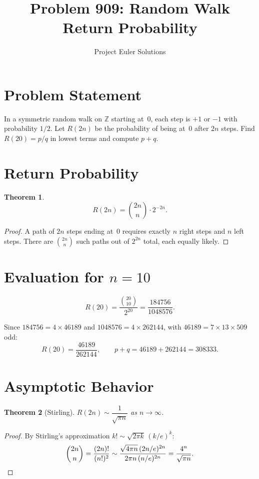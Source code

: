 \documentclass[11pt]{article}
\title{Problem 909: Random Walk Return Probability}
\author{Project Euler Solutions}
\date{}
\newtheorem{theorem}{Theorem}
\begin{document}
\maketitle

\section{Problem Statement}

In a symmetric random walk on $\mathbb{Z}$ starting at~0, each step is $+1$ or $-1$ with probability $1/2$. Let $R(2n)$ be the probability of being at~0 after $2n$ steps. Find $R(20) = p/q$ in lowest terms and compute $p + q$.

\section{Return Probability}

\begin{theorem}
\[
R(2n) = \binom{2n}{n} \cdot 2^{-2n}.
\]
\end{theorem}

\begin{proof}
A path of $2n$ steps ending at~0 requires exactly $n$ right steps and $n$ left steps. There are $\binom{2n}{n}$ such paths out of $2^{2n}$ total, each equally likely.
\end{proof}

\section{Evaluation for $n = 10$}

\[
R(20) = \frac{\binom{20}{10}}{2^{20}} = \frac{184756}{1048576}.
\]

Since $184756 = 4 \times 46189$ and $1048576 = 4 \times 262144$, with $46189 = 7 \times 13 \times 509$ odd:
\[
R(20) = \frac{46189}{262144}, \qquad p + q = 46189 + 262144 = 308333.
\]

\section{Asymptotic Behavior}

\begin{theorem}[Stirling]
$R(2n) \sim \dfrac{1}{\sqrt{\pi n}}$ as $n \to \infty$.
\end{theorem}

\begin{proof}
By Stirling's approximation $k! \sim \sqrt{2\pi k}\,(k/e)^k$:
\[
\binom{2n}{n} = \frac{(2n)!}{(n!)^2} \sim \frac{\sqrt{4\pi n}\,(2n/e)^{2n}}{2\pi n\,(n/e)^{2n}} = \frac{4^n}{\sqrt{\pi n}}. \qedhere
\]
\end{proof}
\end{document}
